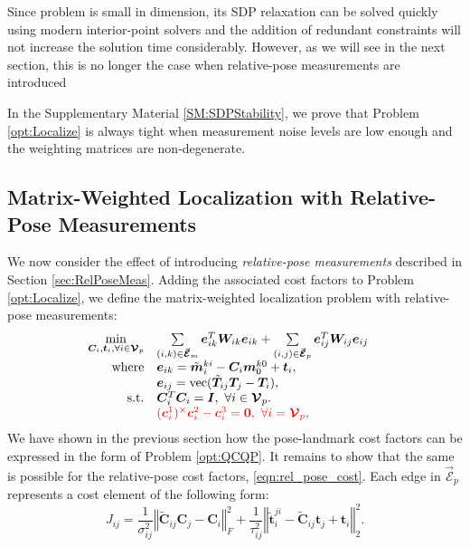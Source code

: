 \documentclass[lettersize,journal]{IEEEtran}
\newcommand{\EdgeSet}{\vec{\bm{\mathcal{E}}}}
\newcommand{\VertSetP}{\bm{\mathcal{V}}_p}
\newcommand{\vect}[1]{\mbox{vec}(#1)}
\newcommand{\rev}[1]{\color{red}{#1}\color{black}}
\begin{document}
Since \rev{each separate } problem is small in dimension, its SDP relaxation can be solved quickly using modern interior-point solvers and the addition of redundant constraints will not increase the solution time considerably. However, as we will see in the next section, this is no longer the case when relative-pose measurements are introduced\rev{, as the problem will no longer be separable.}

In the Supplementary Material \ref{SM:SDPStability}, we prove that Problem \eqref{opt:Localize} is always tight when measurement noise levels are low enough and the weighting matrices are non-degenerate.

\subsection{Matrix-Weighted Localization with Relative-Pose Measurements}\label{sec:LocRelPose}

We now consider the effect of introducing \textit{relative-pose measurements} described in Section \ref{sec:RelPoseMeas}. Adding the associated cost factors to Problem \eqref{opt:Localize}, we define the matrix-weighted localization problem with relative-pose measurements:
\begin{equation}
	\label{opt:LocalizeRelPose}
	\hspace*{-10pt}\begin{array}{rl}
		\min\limits_{\bm{C}_i,\bm{t}_i, \forall  i \in \VertSetP} &\sum\limits_{(i,k)\in\EdgeSet_m} \bm{e}_{ik}^T \bm{W}_{ik} \bm{e}_{ik} +\sum\limits_{(i,j)\in\EdgeSet_p}  \bm{e}_{ij}^T \bm{W}_{ij} \bm{e}_{ij}\\
		\mbox{where} & \bm{e}_{ik} = \tilde{\bm{m}}_i^{ki} - \bm{C}_i\bm{m}_0^{k0} + \bm{t}_i , \\
		&\bm{e}_{ij} = \vect{\tilde{\bm{T}}_{ij}\bm{T}_j - \bm{T}_i}, \\
		\mbox{s.t.} &\bm{C}_i^T \bm{C}_i = \bm{I},~\forall i \in \VertSetP. \\
		& \rev{(\bm{c}_i^{1})^\times\bm{c}_i^{2} - \bm{c}_i^{3} = \bm{0},~\forall i = \VertSetP, }
	\end{array}
\end{equation}
We have shown in the previous section how the pose-landmark cost factors can be expressed in the form of Problem \eqref{opt:QCQP}. It remains to show that the same is possible for the relative-pose cost factors, \eqref{eqn:rel_pose_cost}. Each edge in $\EdgeSet_p$ represents a cost element of the following form:
\begin{equation}
	J_{ij} = \frac{1}{\sigma^2_{ij}} \left\Vert \tilde{\bm{C}}_{ij}\bm{C}_j - \bm{C}_i\right\Vert_F^2 + \frac{1}{\tau^2_{ij}} \left\Vert \tilde{\bm{t}}^{ji}_{i} - \tilde{\bm{C}}_{ij}\bm{t}_j + \bm{t}_i \right\Vert_2^2.
\end{equation}
\end{document}
